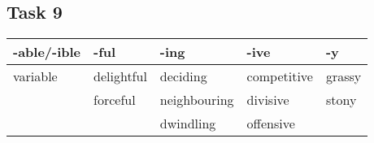 \documentclass[a4paper]{article}
\begin{document}
        \subsection*{Task 9}
            \begin{table}[H]
                \begin{tabular}{@{}ll|l|l|l@{}}
                \toprule
                \multicolumn{1}{|l|}{-able/-ible} & -ful       & -ing         & -ive        & \multicolumn{1}{l|}{-y}     \\ \midrule
                \multicolumn{1}{|l|}{variable}    & delightful & deciding     & competitive & \multicolumn{1}{l|}{grassy} \\ \midrule
                \multicolumn{1}{l|}{}             & forceful   & neighbouring & divisive    & \multicolumn{1}{l|}{stony}  \\ \cmidrule(l){2-5} 
                                                &            & dwindling    & offensive   &                             \\ \cmidrule(lr){3-4}
                \end{tabular}
            \end{table}
\end{document}
